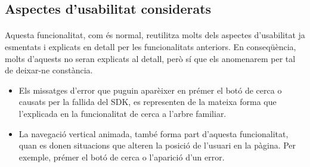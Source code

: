 \subsection{Aspectes d'usabilitat considerats}

    \paragraph{}
    Aquesta funcionalitat, com és normal, reutilitza molts dels aspectes d'usabilitat ja esmentats i explicats en detall per les funcionalitats anteriors. En conseqüència, molts d'aquests no seran explicats al detall, però sí que els anomenarem per tal de deixar-ne constància.

    \begin{itemize}
        \item Els missatges d'error que puguin aparèixer en prémer el botó de cerca o causats per la fallida del SDK, es representen de la mateixa forma que l’explicada en la funcionalitat de cerca a l’arbre familiar.
        \item La navegació vertical animada, també forma part d'aquesta funcionalitat, quan es donen situacions que alteren la posició de l’usuari en la pàgina. Per exemple, prémer el botó de cerca o l'aparició d'un error.
    \end{itemize}

    
    

